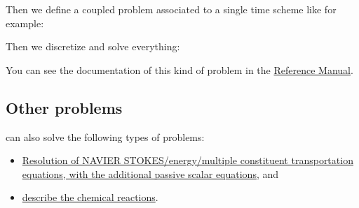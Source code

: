 Then we define a coupled problem associated to a single time scheme like for example:
\begin{center}
\end{center}

Then we discretize and solve everything:
\begin{center}
\end{center}

You can see the documentation of this kind of problem in the \href{\REFERENCEMANUAL\#coupledproblem}{\trustref Reference Manual}.



\subsection{Other problems}
\trust can also solve the following types of problems:
\begin{itemize}
\item \href{\REFERENCEMANUAL\#pbthermohydrauliqueconcentrationscalairespassifs}{Resolution of NAVIER STOKES/energy/multiple constituent transportation equations, with the additional passive scalar equations}, and
\item \href{\REFERENCEMANUAL\#chimie}{describe the chemical reactions}.
\end{itemize}



